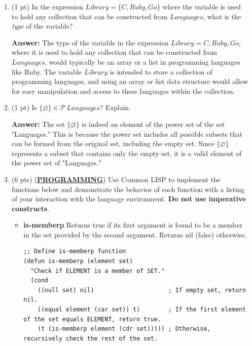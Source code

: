 \documentclass[12pt]{article}
\begin{document}
\begin{spacing}{1.5}
\begin{enumerate}
\begin{enumerate}
		      \end{enumerate}
		      		      		      		      
		\item (1 pt) In the expression $Library = \{C, Ruby, Go\}$ where the variable is used to hold any collection that can be constructed from $Languages$, what is the \textit{type} of the variable?
		      		      		      		      
		      \textbf{Answer:} The type of the variable in the expression $Library = {C, Ruby, Go}$, where it is used to hold any collection that can be constructed from $Languages$, would typically be an array or a list in programming languages like Ruby. The variable $Library$ is intended to store a collection of programming languages, and using an array or list data structure would allow for easy manipulation and access to these languages within the collection.\\
		      		      		      		                  
		\item (1 pt) Is $\{\varnothing\} \in \mathcal{P} \: Languages$? Explain.
		      		      		      		      
		      \textbf{Answer:} The set $\{\varnothing\}$ is indeed an element of the power set of the set "Languages." This is because the power set includes all possible subsets that can be formed from the original set, including the empty set. Since $\{\varnothing\}$ represents a subset that contains only the empty set, it is a valid element of the power set of "Languages."\\
		      		      		      		                  
		\item (6 pts) (\textbf{\uline{{PROGRAMMING}}}) Use Common LISP to implement the functions below and demonstrate the behavior of each function with a listing of your interaction with the language environment. \textbf{Do not use imperative constructs}.
		      		      		      		      
		      \begin{itemize}
		      	\item \textbf{is-memberp} Returns true if its first argument is found to be a member in the set provided by the second argument. Returns nil (false) otherwise.
		      	      		      	      		      	      		      	      
		      	      \begin{lstlisting}
;; Define is-memberp function
(defun is-memberp (element set)
  "Check if ELEMENT is a member of SET."
  (cond
    ((null set) nil)                     ; If empty set, return nil.
    ((equal element (car set)) t)        ; If the first element of the set equals ELEMENT, return true.
    (t (is-memberp element (cdr set))))) ; Otherwise, recursively check the rest of the set.


\end{lstlisting}
\end{itemize}
\end{enumerate}
\end{spacing}
\end{document}
